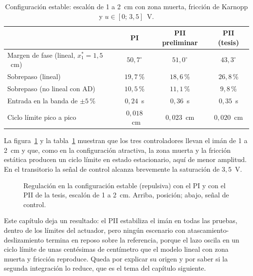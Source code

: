 \begin{table}[ht]
\centering
\caption{Configuración estable: escalón de 1 a 2~cm con zona muerta, fricción de Karnopp y $u\in[0;\,3{,}5]$~V.}
\label{tab:p8_estable}
\begin{tabular}{|l|c|c|c|}
\hline
 & PI & PII preliminar & PII (tesis) \\ \hline
Margen de fase (lineal, $x_1^*=1{,}5$~cm) & $50{,}7^\circ$ & $51{,}0^\circ$ & $43{,}3^\circ$ \\ \hline
Sobrepaso (lineal) & $19{,}7$\,\% & $18{,}6$\,\% & $26{,}8$\,\% \\ \hline
Sobrepaso (no lineal con AD) & $10{,}5$\,\% & $11{,}1$\,\% & $9{,}8$\,\% \\ \hline
Entrada en la banda de $\pm5$\,\% & $0{,}24$~s & $0{,}36$~s & $0{,}35$~s \\ \hline
Ciclo límite pico a pico & $0{,}018$~cm & $0{,}023$~cm & $0{,}020$~cm \\ \hline
\end{tabular}
\end{table}

La figura~\ref{fig:p8_estable} y la tabla~\ref{tab:p8_estable} muestran que los tres controladores llevan el imán de 1 a 2~cm y que, como en la configuración atractiva, la zona muerta y la fricción estática producen un ciclo límite en estado estacionario, aquí de menor amplitud. En el transitorio la señal de control alcanza brevemente la saturación de $3{,}5$~V.

\begin{figure}[ht]
    \centering
    
    \caption[Configuración estable]{Regulación en la configuración estable (repulsiva) con el PI y con el PII de la tesis, escalón de 1 a 2~cm. Arriba, posición; abajo, señal de control.}
    \label{fig:p8_estable}
\end{figure}

\FloatBarrier

Este capítulo deja un resultado: el PII estabiliza el imán en todas las pruebas, dentro de los límites del actuador, pero ningún escenario con atascamiento-deslizamiento termina en reposo sobre la referencia, porque el lazo oscila en un ciclo límite de unas centésimas de centímetro que el modelo lineal con zona muerta y fricción reproduce. Queda por explicar su origen y por saber si la segunda integración lo reduce, que es el tema del capítulo siguiente.
